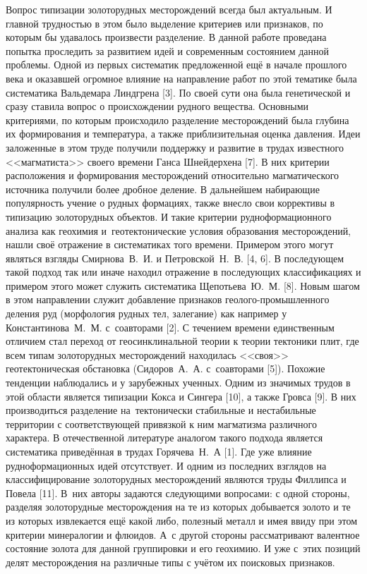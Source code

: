  

\makeProcTitle
{}

Вопрос типизации золоторудных месторождений всегда был актуальным. И главной трудностью в этом было выделение критериев или признаков, по которым бы удавалось произвести разделение. В данной работе проведана попытка проследить за развитием идей и современным состоянием данной проблемы. Одной из первых систематик предложенной ещё в начале прошлого века и оказавшей огромное влияние на направление работ по этой тематике была систематика Вальдемара Линдгрена [3]. По своей сути она была генетической и сразу ставила вопрос о происхождении рудного вещества.  Основными критериями, по которым происходило разделение месторождений была глубина их формирования и температура, а также приблизительная оценка давления. Идеи заложенные в этом труде получили поддержку и развитие в трудах известного <<магматиста>> своего времени Ганса Шнейдерхена [7]. В них критерии расположения и формирования месторождений относительно магматического источника получили более дробное деление.  В дальнейшем набирающие популярность учение о рудных формациях, также внесло свои коррективы в типизацию золоторудных объектов. И такие критерии рудноформационного анализа как геохимия и~геотектонические условия образования месторождений, нашли своё отражение в систематиках того времени. Примером этого могут являться взгляды Смирнова~В.~И. и Петровской~Н.~В. [4, 6]. В последующем такой подход так или иначе находил отражение в последующих классификациях и примером этого может служить систематика Щепотьева~Ю.~М. [8].  Новым шагом в этом направлении служит добавление признаков геолого-промышленного деления руд (морфология рудных тел, залегание) как например у Константинова~М.~М. с~соавторами [2]. С течением времени единственным отличием стал переход от геосинклинальной теории к теории тектоники плит, где всем типам золоторудных месторождений находилась <<своя>> геотектоническая обстановка (Сидоров~А.~А. с~соавторами [5]). Похожие тенденции наблюдались и у зарубежных ученных. Одним из значимых трудов в этой области является типизации Кокса и Сингера [10], а также Гровса [9]. В них производиться разделение на~тектонически стабильные и нестабильные территории с соответствующей привязкой к ним магматизма различного характера. В отечественной литературе аналогом такого подхода является систематика приведённая в трудах Горячева~Н.~А [1]. Где уже влияние рудноформационных идей отсутствует. И одним из последних взглядов на классифицирование золоторудных месторождений являются труды Филлипса и Повела [11]. В~них авторы задаются следующими вопросами: с одной стороны, разделяя золоторудные месторождения на те из которых добывается золото и те из которых извлекается ещё какой либо, полезный металл и имея ввиду при этом критерии минералогии и флюидов. А~с другой стороны рассматривают валентное состояние золота для данной группировки и его геохимию. И уже с~этих позиций делят месторождения на различные типы с учётом их поисковых признаков. 